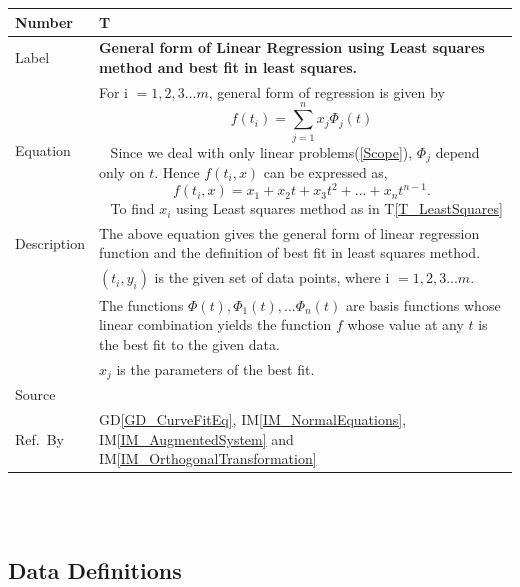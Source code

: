 \documentclass[12pt]{article}
\newcommand{\colAwidth}{0.13\textwidth}
\newcommand{\colBwidth}{0.82\textwidth}
\newcommand{\dref}[1]{GD\ref{#1}}
\newcounter{theorynum} %
\newcommand{\tref}[1]{T\ref{#1}}
\newcommand{\iref}[1]{IM\ref{#1}}
\begin{document}
\begin{minipage}{\textwidth}
	\renewcommand*{\arraystretch}{1.5}
	\begin{tabular}{| p{\colAwidth} | p{\colBwidth}|}
		\hline
		\rowcolor[gray]{0.9}
		Number& T{theorynum}\thetheorynum \label{T_LinearRegression}\\
		\hline
		Label&\bf General form of Linear Regression using Least squares method and best fit in least squares. \\
		\hline
		Equation&  For i $= 1,2,3...m$, general form of regression is given by
		\begin{equation*}
		f(t_i) = \sum_{j=1}^{n}x_j \Phi_j (t)	
		\end{equation*} 
		~\newline
		Since we deal with only linear problems(\ref{Scope}), $\Phi_j$ depend only on $t$. Hence $f(t_i,x) $ can be expressed as,
		\begin{equation*}
		f(t_i,x) = x_1 + x_2 t + x_3 t^{2} + ... + x_n t^{n-1}.
		\end{equation*}
		~\newline
		To find $x_i$ using Least squares method as in \tref{T_LeastSquares}\\
		\hline
		Description & 
		The above equation gives the general form of linear regression function and the definition of best fit in least squares method.\\
		
		&$(t_i,y_i)$ is the given set of data points, where i $= 1,2, 3...m$.\\
		&The functions $\Phi(t), \Phi_1(t), ... \Phi_n(t)$ are basis functions whose linear combination yields the function $f$ whose value at any $t$ is the best fit to the given data.\\
		&$x_j$ is the parameters of the best fit.\\
		\hline
		Source & ~\cite{Health1997}\\
		
		\hline
		Ref.\ By & \dref{GD_CurveFitEq}, \iref{IM_NormalEquations}, \iref{IM_AugmentedSystem} and \iref{IM_OrthogonalTransformation}\\
		\hline
	\end{tabular}
\end{minipage}\\

~\newline



\subsection{Data Definitions} \label{sec_datadef}
\end{document}
